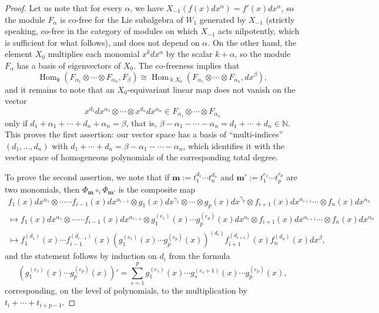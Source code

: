 \documentclass[11pt,reqno]{amsart}
\theoremstyle{plain}
\theoremstyle{definition}
\theoremstyle{remark}
\newcommand{\bk}{\Bbbk}
\DeclareMathOperator{\Hom}{Hom}
\begin{document}
\begin{proof}
Let us note that for every $\alpha$, we have $X_{-1}(f(x)dx^\alpha)=f'(x)dx^\alpha$, so the module $F_\alpha$ is co-free for the Lie subalgebra of $W_1$ generated by $X_{-1}$ (strictly speaking, co-free in the category of modules on which $X_{-1}$ acts nilpotently, which is sufficient for what follows), and does not depend on $\alpha$. On the other hand, the element $X_0$ multiplies each monomial $x^kdx^\alpha$ by the scalar $k+\alpha$, so the module $F_\alpha$ has a basis of eigenvectors of $X_0$. The co-freeness implies that 
 \[
\Hom_{\mathfrak{b}}(F_{\alpha_1}\otimes\cdots\otimes F_{\alpha_n},F_\beta)\cong \Hom_{\bk X_0}(F_{\alpha_1}\otimes\cdots\otimes F_{\alpha_n},dx^\beta),
 \]
and it remains to note that an $X_0$-equivariant linear map does not vanish on the vector 
 \[
x^{d_1}dx^{\alpha_1}\otimes\cdots\otimes x^{d_n}dx^{\alpha_n} \in F_{\alpha_1}\otimes\cdots\otimes F_{\alpha_n}
 \]
only if $d_1+\alpha_1+\cdots+d_n+\alpha_n=\beta$, that is,  $\beta-\alpha_1-\cdots-\alpha_n=d_1+\cdots+d_n\in\mathbb{N}$. This proves the first assertion: our vector space has a basis of ``multi-indices'' $(d_1,\ldots,d_n)$ with $d_1+\cdots+d_n=\beta-\alpha_1-\cdots-\alpha_n$, which identifies it with the vector space of homogeneous polynomials of the corresponding total degree. 

To prove the second assertion, we note that if $\mathbf{m}:=t_1^{d_1}\cdots t_n^{d_n}$ and $\mathbf{m}':=t_1^{e_1}\cdots t_p^{e_p}$ are two monomials, then $\Phi_{\mathbf{m}}\circ_i \Phi_{\mathbf{m}'}$ is the composite map
\begin{multline*}
f_1(x)dx^{\alpha_1}\otimes\cdots\cdots f_{i-1}(x)dx^{\alpha_{i-1}}\otimes g_1(x)dx^{\gamma_1}\otimes\cdots\otimes g_p(x)dx^{\gamma_p}\otimes f_{i+1}(x)dx^{\alpha_{i+1}} \cdots \otimes f_{n}(x)dx^{\alpha_{n}}\\
\mapsto 
f_1(x)dx^{\alpha_1}\otimes\cdots\cdots f_{i-1}(x)dx^{\alpha_{i-1}}\otimes g_1^{(e_1)}(x)\cdots g_p^{(e_p)}(x)dx^{\alpha_i}\otimes f_{i+1}(x)dx^{\alpha_{i+1}} \cdots \otimes f_{n}(x)dx^{\alpha_{n}}\\
\mapsto 
f_1^{(d_1)}(x)\cdots f_{i-1}^{(d_{i-1})}(x) (g_1^{(e_1)}(x)\cdots g_p^{(e_p)}(x))^{(d_i)} f_{i+1}^{(d_{i+1})}(x) f_{n}^{(d_n)}(x)dx^{\beta},
\end{multline*}
and the statement follows by induction on $d_i$ from the formula
 \[
(g_1^{(e_1)}(x)\cdots g_p^{(e_p)}(x))'=\sum_{s=1}^p g_1^{(e_1)}(x)\cdots g_s^{(e_s+1)}(x)\cdots g_p^{(e_p)}(x),    
 \]
corresponding, on the level of polynomials, to the multiplication by $t_i+\cdots+t_{i+p-1}$.
\end{proof}
\end{document}

